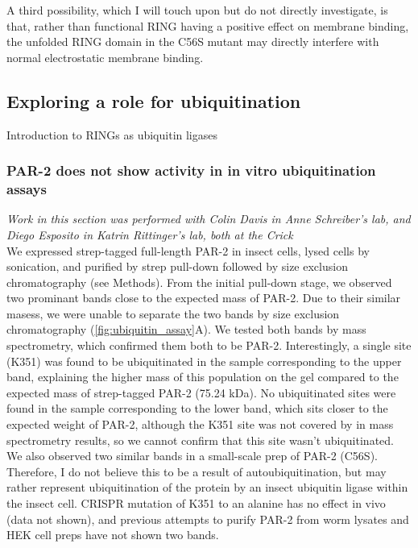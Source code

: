 \documentclass[12pt]{"article"}
\begin{document}
A third possibility, which I will touch upon but do not directly investigate, is that, rather than functional RING having a positive effect on membrane binding, the unfolded RING domain in the C56S mutant may directly interfere with normal electrostatic membrane binding.

\subsection{Exploring a role for ubiquitination}


Introduction to RINGs as ubiquitin ligases\\

\subsubsection{PAR-2 does not show activity in in vitro ubiquitination assays}

\textit{Work in this section was performed with Colin Davis in Anne Schreiber's lab, and Diego Esposito in Katrin Rittinger's lab, both at the Crick}\\


We expressed strep-tagged full-length PAR-2 in insect cells, lysed cells by sonication, and purified by strep pull-down followed by size exclusion chromatography (see Methods). From the initial pull-down stage, we observed two prominant bands close to the expected mass of PAR-2. Due to their similar masess, we were unable to separate the two bands by size exclusion chromatography (\cref{fig:ubiquitin_assay}A). We tested both bands by mass spectrometry, which confirmed them both to be PAR-2. Interestingly, a single site (K351) was found to be ubiquitinated in the sample corresponding to the upper band, explaining the higher mass of this population on the gel compared to the expected mass of strep-tagged PAR-2 (75.24 kDa). No ubiquitinated sites were found in the sample corresponding to the lower band, which sits closer to the expected weight of PAR-2, although the K351 site was not covered by in mass spectrometry results, so we cannot confirm that this site wasn't ubiquitinated. We also observed two similar bands in a small-scale prep of PAR-2 (C56S). Therefore, I do not believe this to be a result of autoubiquitination, but may rather represent ubiquitination of the protein by an insect ubiquitin ligase within the insect cell. CRISPR mutation of K351 to an alanine has no effect in vivo (data not shown), and previous attempts to purify PAR-2 from worm lysates and HEK cell preps have not shown two bands.\\
\end{document}
